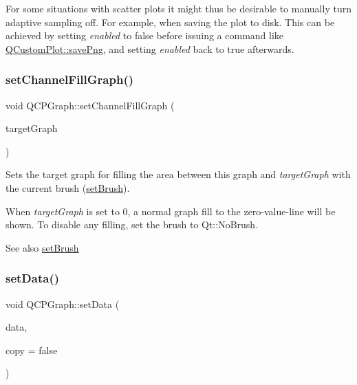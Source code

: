 For some situations with scatter plots it might thus be desirable to manually turn adaptive sampling off. For example, when saving the plot to disk. This can be achieved by setting {\itshape enabled} to false before issuing a command like \hyperlink{class_q_custom_plot_a7636261aff1f6d25c9da749ece3fc8b8}{Q\+Custom\+Plot\+::save\+Png}, and setting {\itshape enabled} back to true afterwards. \hypertarget{class_q_c_p_graph_a2d03156df1b64037a2e36cfa50351ca3}{}\label{class_q_c_p_graph_a2d03156df1b64037a2e36cfa50351ca3} 
\subsubsection{\texorpdfstring{set\+Channel\+Fill\+Graph()}{setChannelFillGraph()}}
{\footnotesize\ttfamily void Q\+C\+P\+Graph\+::set\+Channel\+Fill\+Graph (\begin{DoxyParamCaption}\item[{\hyperlink{class_q_c_p_graph}{Q\+C\+P\+Graph} $\ast$}]{target\+Graph }\end{DoxyParamCaption})}

Sets the target graph for filling the area between this graph and {\itshape target\+Graph} with the current brush (\hyperlink{class_q_c_p_abstract_plottable_a7a4b92144dca6453a1f0f210e27edc74}{set\+Brush}).

When {\itshape target\+Graph} is set to 0, a normal graph fill to the zero-\/value-\/line will be shown. To disable any filling, set the brush to Qt\+::\+No\+Brush.

\begin{DoxySeeAlso}{See also}
\hyperlink{class_q_c_p_abstract_plottable_a7a4b92144dca6453a1f0f210e27edc74}{set\+Brush} 
\end{DoxySeeAlso}
\hypertarget{class_q_c_p_graph_a1df2fd710545c8ba3b2c99a39a27bf8b}{}\label{class_q_c_p_graph_a1df2fd710545c8ba3b2c99a39a27bf8b} 
\subsubsection{\texorpdfstring{set\+Data()}{setData()}\hspace{0.1cm}{\footnotesize\ttfamily [1/2]}}
{\footnotesize\ttfamily void Q\+C\+P\+Graph\+::set\+Data (\begin{DoxyParamCaption}\item[{\hyperlink{qcustomplot_8h_a84a9c4a4c2216ccfdcb5f3067cda76e3}{Q\+C\+P\+Data\+Map} $\ast$}]{data,  }\item[{bool}]{copy = {\ttfamily false} }\end{DoxyParamCaption})}

